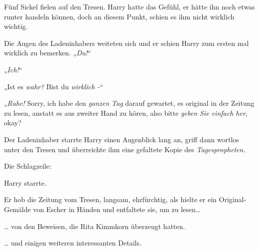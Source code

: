 Fünf Sickel fielen auf den Tresen. Harry hatte das Gefühl, er hätte ihn noch etwas runter handeln können, doch an diesem Punkt, schien es ihm nicht wirklich wichtig.

Die Augen des Ladeninhabers weiteten sich und er schien Harry zum ersten mal wirklich zu bemerken. „\emph{Du!}“

„\emph{Ich!}“

„Ist es \emph{wahr?} Bist du \emph{wirklich -}“

„\emph{Ruhe!} Sorry, ich habe den \emph{ganzen Tag} darauf gewartet, es original in der Zeitung zu lesen, anstatt es aus zweiter Hand zu hören, also bitte \emph{geben Sie einfach her,} okay?

Der Ladeninhaber starrte Harry einen Augenblick lang an, griff dann wortlos unter den Tresen und überreichte ihm eine gefaltete Kopie des \emph{Tagespropheten.}

Die Schlagzeile:


Harry starrte.

Er hob die Zeitung vom Tresen, langsam, ehrfürchtig, als hielte er ein Original-Gemälde von Escher in Händen und entfaltete sie, um zu lesen…

… von den Beweisen, die Rita Kimmkorn überzeugt hatten.

… und einigen weiteren interessanten Details.

